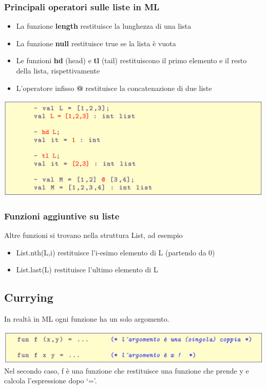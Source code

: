 \documentclass[10pt]{article}
\begin{document}
\subsubsection{Principali operatori sulle liste in ML}
\begin{itemize}
    \item La funzione \textbf{length} restituisce la lunghezza di una lista
    \item La funzione \textbf{null} restituisce true se la lista è vuota
    \item Le funzioni \textbf{hd} (head) e \textbf{tl} (tail) restituiscono il primo elemento e il resto della lista, rispettivamente
    \item L’operatore infisso \textbf{@} restituisce la concatenazione di due liste
\end{itemize}
\includegraphics[scale=0.2]{Immagini/ml26.png}
\subsubsection{Funzioni aggiuntive su liste}
Altre funzioni si trovano nella struttura List, ad esempio
\begin{itemize}
    \item List.nth(L,i) restituisce l’i-esimo elemento di L (partendo
da 0)
\item List.last(L) restituisce l’ultimo elemento di L
\end{itemize}
\subsection{Currying}
In realtà in ML ogni funzione ha un solo argomento.

\includegraphics[scale=0.2]{Immagini/ml27.png}
\\Nel secondo caso, f è una funzione che restituisce una funzione
che prende y e calcola l’espressione dopo ‘=’.
\end{document}
